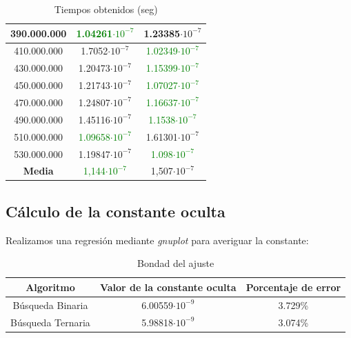 \documentclass[12pt,spanish]{article}
\begin{document}
\begin{table}[H]
\begin{tabular}{|c|c|c|}
\hline
390.000.000 & \textcolor{green}{1.04261$\cdot 10^{-7}$} & 1.23385$\cdot 10^{-7}$\\
\hline
410.000.000 & 1.7052$\cdot 10^{-7}$ & \textcolor{green}{1.02349$\cdot 10^{-7}$}\\
\hline
430.000.000 & 1.20473$\cdot 10^{-7}$ & \textcolor{green}{1.15399$\cdot 10^{-7}$}\\
\hline
450.000.000 & 1.21743$\cdot 10^{-7}$ & \textcolor{green}{1.07027$\cdot 10^{-7}$}\\
\hline
470.000.000 & 1.24807$\cdot 10^{-7}$ & \textcolor{green}{1.16637$\cdot 10^{-7}$}\\
\hline
490.000.000 & 1.45116$\cdot 10^{-7}$ & \textcolor{green}{1.1538$\cdot 10^{-7}$}\\
\hline
510.000.000 & \textcolor{green}{1.09658$\cdot 10^{-7}$} & 1.61301$\cdot 10^{-7}$\\
\hline
530.000.000 & 1.19847$\cdot 10^{-7}$ & \textcolor{green}{1.098$\cdot 10^{-7}$}\\
\hline
\hline
\textbf{Media} & \textcolor{green}{1,144$\cdot 10^{-7}$} & 1,507$\cdot 10^{-7}$\\
\hline
\end{tabular}
\caption{Tiempos obtenidos (seg)}
\end{table}

\subsection{Cálculo de la constante oculta}
Realizamos una regresión mediante \emph{gnuplot} para averiguar la constante:
\begin{table}[H]
\begin{tabular}{|c|c|c|}
\hline
\textbf{Algoritmo} & \textbf{Valor de la constante oculta} & \textbf{Porcentaje de error}\\
\hline
Búsqueda Binaria & 6.00559$\cdot 10^{-9}$ & 3.729\% \\
\hline
Búsqueda Ternaria & 5.98818$\cdot 10^{-9}$ & 3.074\%\\
\hline
\end{tabular}
\caption{Bondad del ajuste}
\end{table}
\newpage
\end{document}
